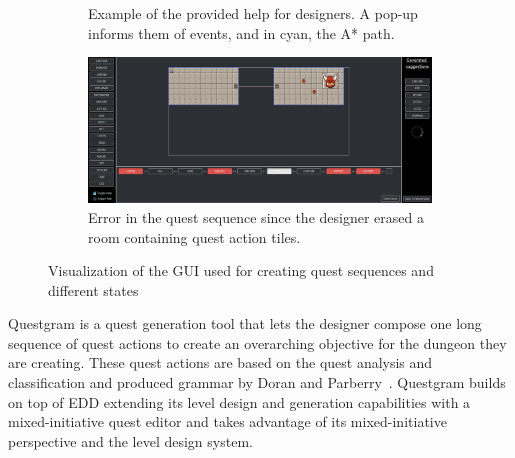 \begin{figure}[t]
\begin{subfigure}[t]{0.48\textwidth}
        \caption{Example of the provided help for designers. A pop-up informs them of events, and in cyan, the A* path.}
        \label{figs:GUI:help}
    \end{subfigure}%
     \begin{subfigure}[t]{0.48\textwidth}
        \centering
        \includegraphics[width=.99\textwidth]{included-papers-tex/paper-8/figures/main-errorQ.png}
        \caption{Error in the quest sequence since the designer erased a room containing quest action tiles.}
        \label{figs:GUI:error}
    \end{subfigure} \hfill%
    \caption{Visualization of the GUI used for creating quest sequences and different states}
    \label{figs:GUI}
\end{figure}

Questgram is a quest generation tool that lets the designer compose one long sequence of quest actions to create an overarching objective for the dungeon they are creating. These quest actions are based on the quest analysis and classification and produced grammar by Doran and Parberry~\cite{p8Doran2011-questsMMORPGs}. Questgram builds on top of EDD extending its level design and generation capabilities with a mixed-initiative quest editor and takes advantage of its mixed-initiative perspective and the level design system.





